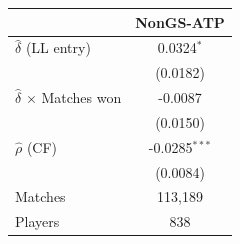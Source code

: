 \begin{tabular}{lc}
\toprule
 & NonGS-ATP \\
\midrule
$\hat{\delta}$ (LL entry) & 0.0324$^{*}$ \\
 & (0.0182) \\
$\hat{\delta}$ $\times$ Matches won & -0.0087 \\
 & (0.0150) \\
$\hat{\rho}$ (CF) & -0.0285$^{***}$ \\
 & (0.0084) \\
\midrule
Matches & 113,189 \\
Players & 838 \\
\bottomrule
\end{tabular}
